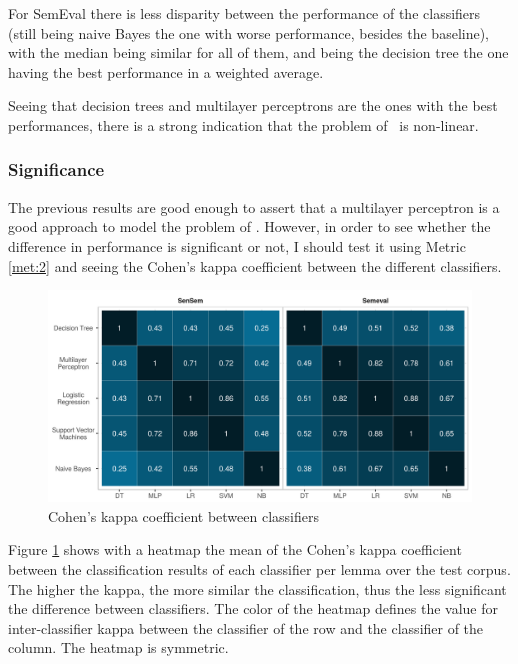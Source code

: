 For SemEval there is less disparity between the performance of the classifiers
(still being naive Bayes the one with worse performance, besides the baseline),
with the median being similar for all of them, and being the decision tree the
one having the best performance in a weighted average. 

Seeing that decision trees and multilayer perceptrons are the ones with the
best performances, there is a strong indication that the problem of
\vsd~is non-linear.

\subsubsection{Significance}

The previous results are good enough to assert that a multilayer perceptron is
a good approach to model the problem of \vsd. However, in order to see whether
the difference in performance is significant or not, I should test it using
Metric \ref{met:2} and seeing the Cohen's kappa coefficient between the
different classifiers.

\begin{figure}[ht]
	\includegraphics[width=\textwidth]{plots/supervised/inteclassifier_kappa}
  \caption{Cohen's kappa coefficient between classifiers}
  \label{fig:supervised:kappa}
\end{figure}

Figure \ref{fig:supervised:kappa} shows with a heatmap the mean of the Cohen's
kappa coefficient between the classification results of each classifier per
lemma over the test corpus. The higher the kappa, the more similar the
classification, thus the less significant the difference between classifiers.
The color of the heatmap defines the value for inter-classifier kappa between
the classifier of the row and the classifier of the column. The heatmap is
symmetric.

